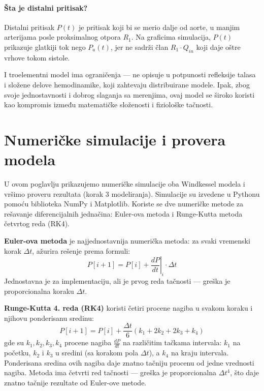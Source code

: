 \documentclass[12pt,a4paper]{article}
\begin{document}
\paragraph{Šta je distalni pritisak?} Distalni pritisak $P(t)$ je pritisak koji bi se merio dalje od aorte, u manjim arterijama posle proksimalnog otpora $R_1$. Na graficima simulacija, $P(t)$ prikazuje glatkiji tok nego $P_a(t)$, jer ne sadrži član $R_1\cdot Q_{in}$ koji daje oštre vrhove tokom sistole.

I troelementni model ima ograničenja --- ne opisuje u potpunosti refleksije talasa i složene delove hemodinamike, koji zahtevaju distribuirane modele. Ipak, zbog svoje jednostavnosti i dobrog slaganja sa merenjima, ovaj model se široko koristi kao kompromis između matematičke složenosti i fiziološke tačnosti.

\section{Numeričke simulacije i provera modela}

U ovom poglavlju prikazujemo numeričke simulacije oba Windkessel modela i vršimo proveru rezultata (korak 3 modeliranja). Simulacije su izvedene u Pythonu pomoću biblioteka NumPy i Matplotlib. Koriste se dve numeričke metode za rešavanje diferencijalnih jednačina: Euler-ova metoda i Runge-Kutta metoda četvrtog reda (RK4).

\textbf{Euler-ova metoda} je najjednostavnija numerička metoda: za svaki vremenski korak $\Delta t$, ažurira rešenje prema formuli:
\begin{equation}
    P[i+1] = P[i] + \left.\frac{dP}{dt}\right|_i \cdot \Delta t
\end{equation}
Jednostavna je za implementaciju, ali je prvog reda tačnosti --- greška je proporcionalna koraku $\Delta t$.

\textbf{Runge-Kutta 4. reda (RK4)} koristi četiri procene nagiba u svakom koraku i njihovu ponderisanu sredinu:
\begin{equation}
    P[i+1] = P[i] + \frac{\Delta t}{6}\left(k_1 + 2k_2 + 2k_3 + k_4\right)
\end{equation}
gde su $k_1, k_2, k_3, k_4$ procene nagiba $\frac{dP}{dt}$ na različitim tačkama intervala: $k_1$ na početku, $k_2$ i $k_3$ u sredini (sa korakom pola $\Delta t$), a $k_4$ na kraju intervala. Ponderisana sredina ovih nagiba daje znatno tačniju procenu od jedne vrednosti nagiba. Metoda ima četvrti red tačnosti --- greška je proporcionalna $\Delta t^4$, što daje znatno tačnije rezultate od Euler-ove metode.
\end{document}
